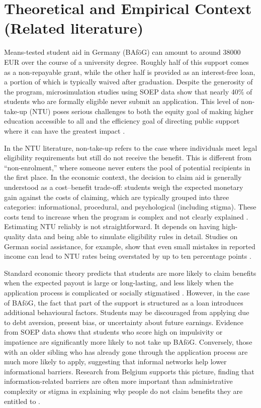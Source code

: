 \section{Theoretical and Empirical Context (Related literature)}
\label{section:theoretical_empirical_context}

Means-tested student aid in Germany (BAföG) can amount to around 38000 EUR over the course of a university degree. Roughly half of this support comes as a non-repayable grant, while the other half is provided as an interest-free loan, a portion of which is typically waived after graduation. Despite the generosity of the program, microsimulation studies using SOEP data show that nearly 40\% of students who are formally eligible never submit an application. This level of non-take-up (NTU) poses serious challenges to both the equity goal of making higher education accessible to all and the efficiency goal of directing public support where it can have the greatest impact \citep{herber_non-take-up_2019}.

In the NTU literature, non-take-up refers to the case where individuals meet legal eligibility requirements but still do not receive the benefit. 
This is different from “non-enrolment,” where someone never enters the pool of potential recipients in the first place. 
In the economic context, the decision to claim aid is generally understood as a cost–benefit trade-off: students weigh the expected monetary gain against the costs of claiming, which are typically grouped into three categories: informational, procedural, and psychological (including stigma). 
These costs tend to increase when the program is complex and not clearly explained \citep{booij_role_2012}. Estimating NTU reliably is not straightforward. It depends on having high-quality data and being able to simulate eligibility rules in detail. Studies on German social assistance, for example, show that even small mistakes in reported income can lead to NTU rates being overstated by up to ten percentage points \citep{frick_claim_2007}.

Standard economic theory predicts that students are more likely to claim benefits when the expected payout is large or long-lasting, and less likely when the application process is complicated or socially stigmatised \citep{booij_role_2012}. However, in the case of BAföG, the fact that part of the support is structured as a loan introduces additional behavioural factors. Students may be discouraged from applying due to debt aversion, present bias, or uncertainty about future earnings. Evidence from SOEP data shows that students who score high on impulsivity or impatience are significantly more likely to not take up BAföG. Conversely, those with an older sibling who has already gone through the application process are much more likely to apply, suggesting that informal networks help lower informational barriers. Research from Belgium supports this picture, finding that information-related barriers are often more important than administrative complexity or stigma in explaining why people do not claim benefits they are entitled to \citep{fidan_why_2021, herber_non-take-up_2019, bolland_information_nodate}.

